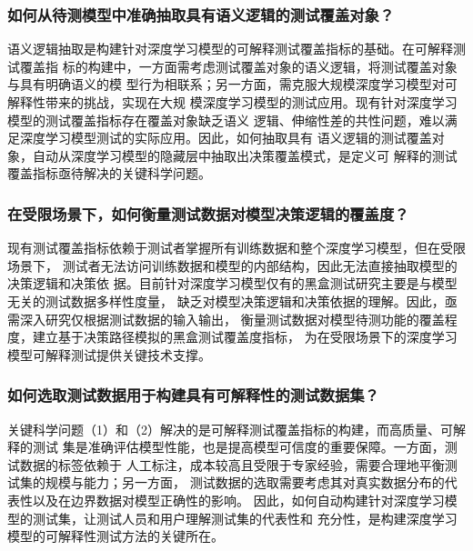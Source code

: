 \subsubsection{如何从待测模型中准确抽取具有语义逻辑的测试覆盖对象？}

语义逻辑抽取是构建针对深度学习模型的可解释测试覆盖指标的基础。在可解释测试覆盖指
标的构建中，一方面需考虑测试覆盖对象的语义逻辑，将测试覆盖对象与具有明确语义的模
型行为相联系；另一方面，需克服大规模深度学习模型对可解释性带来的挑战，实现在大规
模深度学习模型的测试应用。现有针对深度学习模型的测试覆盖指标存在覆盖对象缺乏语义
逻辑、伸缩性差的共性问题，难以满足深度学习模型测试的实际应用。因此，如何抽取具有
语义逻辑的测试覆盖对象，自动从深度学习模型的隐藏层中抽取出决策覆盖模式，是定义可
解释的测试覆盖指标亟待解决的关键科学问题。


\subsubsection{在受限场景下，如何衡量测试数据对模型决策逻辑的覆盖度？}
现有测试覆盖指标依赖于测试者掌握所有训练数据和整个深度学习模型，但在受限场景下，
测试者无法访问训练数据和模型的内部结构，因此无法直接抽取模型的决策逻辑和决策依
据。目前针对深度学习模型仅有的黑盒测试研究主要是与模型无关的测试数据多样性度量，
缺乏对模型决策逻辑和决策依据的理解。因此，亟需深入研究仅根据测试数据的输入输出，
衡量测试数据对模型待测功能的覆盖程度，建立基于决策路径模拟的黑盒测试覆盖度指标，
为在受限场景下的深度学习模型可解释测试提供关键技术支撑。


\subsubsection{如何选取测试数据用于构建具有可解释性的测试数据集？}
关键科学问题（1）和（2）解决的是可解释测试覆盖指标的构建，而高质量、可解释的测试
集是准确评估模型性能，也是提高模型可信度的重要保障。一方面，测试数据的标签依赖于
人工标注，成本较高且受限于专家经验，需要合理地平衡测试集的规模与能力；另一方面，
测试数据的选取需要考虑其对真实数据分布的代表性以及在边界数据对模型正确性的影响。
因此，如何自动构建针对深度学习模型的测试集，让测试人员和用户理解测试集的代表性和
充分性，是构建深度学习模型的可解释性测试方法的关键所在。

\iffalse
    \begin{figure}[htp]
        \begin{small}
            \begin{center}
                \texttt{[image: ch2\_WBtest.pdf]}
            \end{center}
            \caption{基于层次语义理解的白盒测试研究内容}
            \label{fig:ch2:WBtest}
        \end{small}
    \end{figure}


    \begin{figure}[htp]
        \begin{small}
            \begin{center}
                \texttt{[image: ch2\_TestSelection.pdf]}
            \end{center}
            \caption{可解释预测模型研究内容}
            \label{fig:ch2:testselection}
        \end{small}
    \end{figure}

\fi